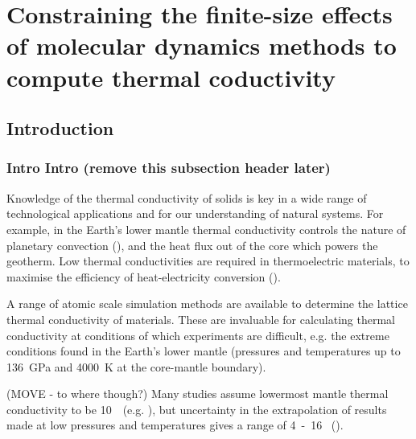 
\chapter{Constraining the finite-size effects of molecular dynamics methods to compute thermal coductivity} %

\label{Chapter3} %

\section{\label{sec:intro}Introduction}

\subsection{\label{sec:intro.intro}Intro Intro (remove this subsection header later)}
Knowledge of the thermal conductivity of solids is key in a wide range of technological applications and for our understanding of natural systems. For example, in the Earth's lower mantle thermal conductivity controls the nature of planetary convection (\citet{Tosi2013}), and the heat flux out of the core which powers the geotherm. Low thermal conductivities are required in thermoelectric materials, to maximise the efficiency of heat-electricity conversion (\citet{Snyder2008}).

A range of atomic scale simulation methods are available to determine the lattice thermal conductivity of materials. These are invaluable for calculating thermal conductivity at conditions of which experiments are difficult, e.g. the extreme conditions found in the Earth's lower mantle (pressures and temperatures up to 136~GPa and 4000~K at the core-mantle boundary).

(MOVE - to where though?) Many studies assume lowermost mantle thermal conductivity to be 10~\wmk~(e.g. \citet{Lay2008}), but uncertainty in the extrapolation of results made at low pressures and temperatures gives a range of 4~-~16 \wmk~(\citet{Brown1986, Osako1991, Hofmeister1999, Goncharov2009, Manthilake2011, Ohta2012}).